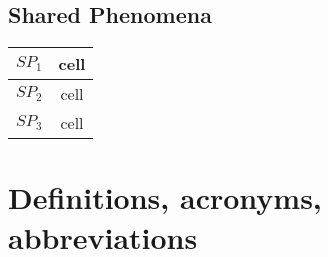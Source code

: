 \documentclass[a4paper,12pt]{book}
\begin{document}
\subsection{Shared Phenomena}
\begin{center}
	\begin{tabular}{ c|c } 
		\hline
		$SP_1$ & cell \\ 
		\hline
		$SP_2$ & cell \\ 
		\hline
		$SP_3$ & cell \\ 
		\hline
	\end{tabular}
\end{center}


\section{Definitions, acronyms, abbreviations}
\end{document}
